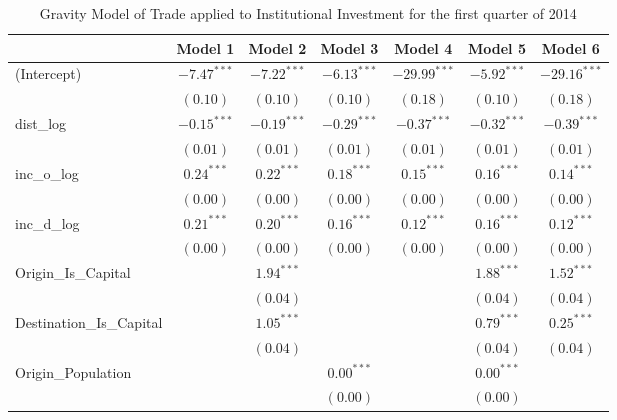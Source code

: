 \begin{table}
	\small
	\begin{center}
		\caption[Gravity Model of trade for Q1 2014]{Gravity Model of Trade applied to Institutional Investment for the first quarter of 2014}
		\begin{tabular}{l c c c c c c }
			\hline
			& Model 1 & Model 2 & Model 3 & Model 4 & Model 5 & Model 6 \\
			\hline
			(Intercept)                  & $-7.47^{***}$ & $-7.22^{***}$ & $-6.13^{***}$ & $-29.99^{***}$ & $-5.92^{***}$ & $-29.16^{***}$ \\
			& $(0.10)$      & $(0.10)$      & $(0.10)$      & $(0.18)$       & $(0.10)$      & $(0.18)$       \\
			dist\_log                    & $-0.15^{***}$ & $-0.19^{***}$ & $-0.29^{***}$ & $-0.37^{***}$  & $-0.32^{***}$ & $-0.39^{***}$  \\
			& $(0.01)$      & $(0.01)$      & $(0.01)$      & $(0.01)$       & $(0.01)$      & $(0.01)$       \\
			inc\_o\_log                  & $0.24^{***}$  & $0.22^{***}$  & $0.18^{***}$  & $0.15^{***}$   & $0.16^{***}$  & $0.14^{***}$   \\
			& $(0.00)$      & $(0.00)$      & $(0.00)$      & $(0.00)$       & $(0.00)$      & $(0.00)$       \\
			inc\_d\_log                  & $0.21^{***}$  & $0.20^{***}$  & $0.16^{***}$  & $0.12^{***}$   & $0.16^{***}$  & $0.12^{***}$   \\
			& $(0.00)$      & $(0.00)$      & $(0.00)$      & $(0.00)$       & $(0.00)$      & $(0.00)$       \\
			Origin\_Is\_Capital          &               & $1.94^{***}$  &               &                & $1.88^{***}$  & $1.52^{***}$   \\
			&               & $(0.04)$      &               &                & $(0.04)$      & $(0.04)$       \\
			Destination\_Is\_Capital     &               & $1.05^{***}$  &               &                & $0.79^{***}$  & $0.25^{***}$   \\
			&               & $(0.04)$      &               &                & $(0.04)$      & $(0.04)$       \\
			Origin\_Population           &               &               & $0.00^{***}$  &                & $0.00^{***}$  &                \\
			&               &               & $(0.00)$      &                & $(0.00)$      &                \\

\end{tabular}
\end{center}
\end{table}
